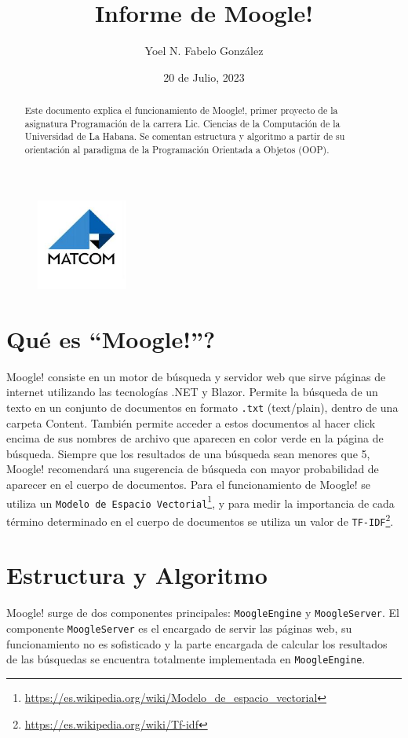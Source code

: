 \documentclass[a4paper,12pt]{article}
\begin{document}
\title{
    \textbf{Informe de Moogle!}
}
\author{Yoel N. Fabelo González}
\date{20 de Julio, 2023}
\maketitle

\begin{figure}[h]
    \center
    \includegraphics[width=3cm]{matcom.jpg}
\end{figure}

\begin{abstract}
    Este documento explica el funcionamiento de Moogle!, primer proyecto de la asignatura
Programación de la carrera Lic. Ciencias de la Computación de la Universidad de La Habana.
Se comentan estructura y algoritmo a partir de su orientación al paradigma de la
Programación Orientada a Objetos (OOP).
\end{abstract}

\section{\textquestiondown Qu\'e es ``Moogle!''?}
    Moogle! consiste en un motor de búsqueda y servidor web que sirve páginas de internet
utilizando las tecnologías .NET y Blazor. Permite la búsqueda de un texto en un conjunto de
documentos en formato \texttt{.txt} (text/plain), dentro de una carpeta Content. También permite
acceder a estos documentos al hacer click encima de sus nombres de archivo que aparecen en color
verde en la página de búsqueda. Siempre que los resultados de una búsqueda sean menores que 5, Moogle!
recomendará una sugerencia de búsqueda con mayor probabilidad de aparecer en el cuerpo de documentos.
    Para el funcionamiento de Moogle! se utiliza un \texttt{Modelo de Espacio Vectorial}\footnote{
\url{https://es.wikipedia.org/wiki/Modelo_de_espacio_vectorial}}, y para medir la importancia de cada término determinado
en el cuerpo de documentos se utiliza un valor de \texttt{TF-IDF}\footnote{\url{https://es.wikipedia.org/wiki/Tf-idf}}.

\newpage
\section{Estructura y Algoritmo}
    Moogle! surge de dos componentes principales: \texttt{MoogleEngine} y \texttt{MoogleServer}.
\newline El componente \texttt{MoogleServer} es el encargado de servir las páginas web, su funcionamiento no es sofisticado
y la parte encargada de calcular los resultados de las búsquedas se encuentra totalmente implementada en \texttt{MoogleEngine}.
\newline
\end{document}
